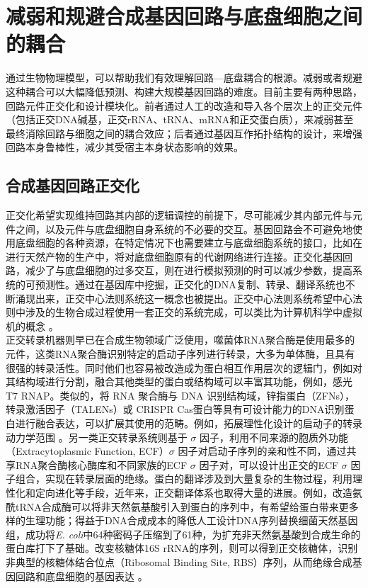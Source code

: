 \documentclass[b5paper,9pt,oneolumn,twoside,UTF8]{article}
\begin{document}
\section{减弱和规避合成基因回路与底盘细胞之间的耦合}
通过生物物理模型，可以帮助我们有效理解回路---底盘耦合的根源。减弱或者规避这种耦合可以大幅降低预测、构建大规模基因回路的难度。目前主要有两种思路，回路元件正交化\cite{Rackham2005}和设计模块化\cite{DelVecchio2015, Isaacs2004}。前者通过人工的改造和导入各个层次上的正交元件（包括正交DNA碱基，正交rRNA、tRNA、mRNA和正交蛋白质），来减弱甚至最终消除回路与细胞之间的耦合效应；后者通过基因互作拓扑结构的设计，来增强回路本身鲁棒性，减少其受宿主本身状态影响的效果。
\subsection{合成基因回路正交化}
正交化希望实现维持回路其内部的逻辑调控的前提下，尽可能减少其内部元件与元件之间，以及元件与底盘细胞自身系统的不必要的交互。基因回路会不可避免地使用底盘细胞的各种资源，在特定情况下也需要建立与底盘细胞系统的接口，比如在进行天然产物的生产中，将对底盘细胞原有的代谢网络进行连接\cite{Martin2003, Atsumi2008}。正交化基因回路，减少了与底盘细胞的过多交互，则在进行模拟预测的时可以减少参数，提高系统的可预测性。通过在基因库中挖掘，正交化的DNA复制、转录、翻译系统也不断涌现出来，正交中心法则系统这一概念也被提出。正交中心法则系统希望中心法则中涉及的生物合成过程使用一套正交的系统完成，可以类比为计算机科学中虚拟机的概念 \cite{Liu2018b}。\\ %
\indent 正交转录机器则早已在合成生物领域广泛使用，噬菌体RNA聚合酶是使用最多的元件，这类RNA聚合酶识别特定的启动子序列进行转录，大多为单体酶，且具有很强的转录活性。同时他们也容易被改造成为蛋白相互作用层次的逻辑门，例如对其结构域进行分割，融合其他类型的蛋白或结构域可以丰富其功能，例如，感光T7 RNAP\cite{Han2017, Baumschlager2017}。类似的，将 RNA 聚合酶与 DNA 识别结构域，锌指蛋白（ZFNs），转录激活因子（TALENs）或 CRISPR Cas蛋白等具有可设计能力的DNA识别蛋白进行融合表达，可以扩展其使用的范畴。例如，拓展理性化设计的启动子的转录动力学范围 \cite{McCutcheon2018}。另一类正交转录系统则基于 $\sigma$ 因子，利用不同来源的胞质外功能（Extracytoplasmic Function, ECF）$\sigma$ 因子对启动子序列的亲和性不同，通过共享RNA聚合酶核心酶库和不同家族的ECF $\sigma$ 因子对，可以设计出正交的ECF $\sigma$ 因子组合，实现在转录层面的绝缘\cite{rhodius2013}。蛋白的翻译涉及到大量复杂的生物过程，利用理性化和定向进化等手段，近年来，正交翻译体系也取得大量的进展。例如，改造氨酰tRNA合成酶可以将非天然氨基酸引入到蛋白的序列中，有希望给蛋白带来更多样的生理功能；得益于DNA合成成本的降低人工设计DNA序列替换细菌天然基因组，成功将\emph{E. coli}中64种密码子压缩到了61种，为扩充非天然氨基酸到合成生命的蛋白库打下了基础\cite{Fredens2019}。改变核糖体16S rRNA的序列，则可以得到正交核糖体，识别非典型的核糖体结合位点（Ribosomal Binding Site, RBS）序列，从而绝缘合成基因回路和底盘细胞的基因表达 \cite{Rackham2005, An2009a}。\\
\end{document}
